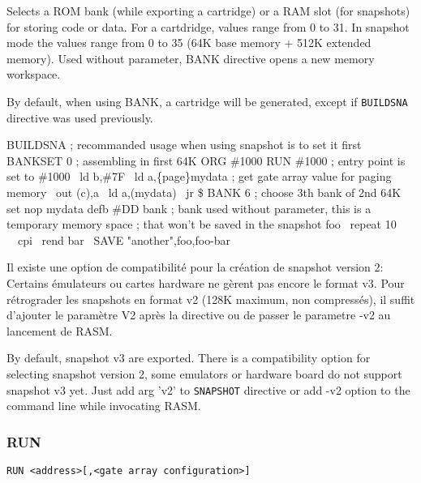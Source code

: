 \begin{xen}
Selects a ROM bank (while exporting a cartridge) or a RAM slot (for snapshots) for storing code or data.
For a cartdridge, values range from 0 to 31. In snapshot mode the values range from 0 to 35 (64K base memory + 512K extended memory).
Used without parameter, BANK directive opens a new memory workspace.

By default, when using BANK, a cartridge will be generated, except if \texttt{BUILDSNA} directive was used previously.

\end{xen}

\begin{code}
BUILDSNA ; recommanded usage when using snapshot is to set it first
BANKSET 0 ; assembling in first 64K
ORG \#1000
RUN \#1000 ; entry point is set to \#1000
\medskip
\ ld b,\#7F
\ ld a,\{page\}mydata ; get gate array value for paging memory
\ out (c),a
\ ld a,(mydata)
\ jr \$
\medskip
BANK 6 ; choose 3th bank of 2nd 64K set
nop
mydata defb \#DD
\medskip
bank
; bank used without parameter, this is a temporary memory space
; that won't be saved in the snapshot
\medskip
foo
\  repeat 10
\ \ cpi
\ rend
bar
\ SAVE "another",foo,foo-bar
\end{code}

\begin{xfr}
Il existe une option de compatibilité pour la création de snapshot version 2: Certains émulateurs ou cartes hardware ne gèrent pas encore le format v3. Pour rétrograder les snapshots en format v2 (128K maximum, non compressés), il suffit d'ajouter le paramètre V2 après la directive ou de passer le parametre -v2 au lancement de RASM.
\end{xfr}

\begin{xen}
By default, snapshot v3 are exported. There is a compatibility option for selecting snapshot version 2, some emulators or hardware board do not support snapshot v3 yet. Just add arg 'v2' to \texttt{SNAPSHOT} directive or add -v2 option to the command line while invocating RASM.
\end{xen}


\begin{xen}
\end{xen}


\subsubsection{RUN}
\begin{verbatim}
RUN <address>[,<gate array configuration>]
\end{verbatim}

